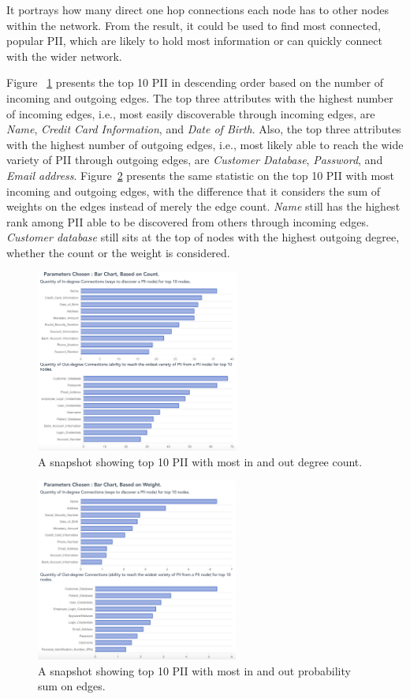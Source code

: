 \documentclass[conference]{IEEEtran}
\begin{document}
It portrays how many direct one hop connections each node has to other nodes within the network. From the result, it could be used to find most connected, popular PII, which are likely to hold most information or can quickly connect with the wider network. 

Figure ~\ref{fig:barchart_most_count} presents the top 10 PII in descending order based on the number of incoming and outgoing edges. The top three attributes with the highest number of incoming edges, i.e., most easily discoverable through incoming edges, are \textit{Name}, \textit{Credit Card Information}, and \textit{Date of Birth}. Also, the top three attributes with the highest number of outgoing edges, i.e., most likely able to reach the wide variety of PII through outgoing edges, are \textit{Customer Database}, \textit{Password}, and \textit{Email address}. Figure~\ref{fig:barchart_most_weight} presents the same statistic on the top 10 PII with most incoming and outgoing edges, with the difference that it considers the sum of weights on the edges instead of merely the edge count. \textit{Name} still has the highest rank among PII able to be discovered from others through incoming edges. \textit{Customer database} still sits at the top of nodes with the highest outgoing degree, whether the count or the weight is considered.

\begin{figure}[h!]
  \includegraphics[width=\linewidth, height=6cm]{barchart_most_count.png}
  \caption{A snapshot showing top 10 PII with most in and out degree count.}
  \label{fig:barchart_most_count}
\end{figure}

\begin{figure}[h!]
  \includegraphics[width=\linewidth, height=6cm]{barchart_most_weight.png}
  \caption{A snapshot showing top 10 PII with most in and out probability sum on edges.}
  \label{fig:barchart_most_weight}
\end{figure}
\end{document}
